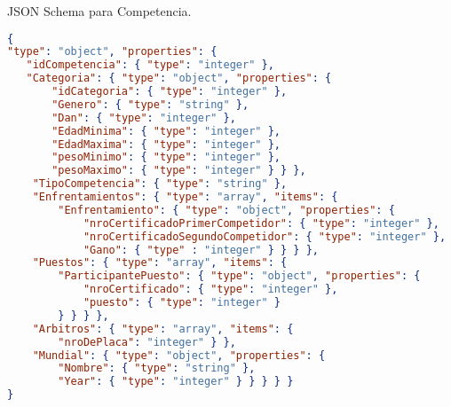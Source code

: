 JSON Schema para Competencia.
\begin{lstlisting}[language=json]
{
"type": "object", "properties": {
   "idCompetencia": { "type": "integer" },
   "Categoria": { "type": "object", "properties": {
       "idCategoria": { "type": "integer" },
       "Genero": { "type": "string" },
       "Dan": { "type": "integer" },
       "EdadMinima": { "type": "integer" },
       "EdadMaxima": { "type": "integer" },
       "pesoMinimo": { "type": "integer" },
       "pesoMaximo": { "type": "integer" } } },
    "TipoCompetencia": { "type": "string" },
    "Enfrentamientos": { "type": "array", "items": {
        "Enfrentamiento": { "type": "object", "properties": {
            "nroCertificadoPrimerCompetidor": { "type": "integer" },
            "nroCertificadoSegundoCompetidor": { "type": "integer" },
            "Gano": { "type" : "integer" } } } },
    "Puestos": { "type": "array", "items": {
        "ParticipantePuesto": { "type": "object", "properties": {
            "nroCertificado": { "type": "integer" },
            "puesto": { "type": "integer" }
        } } } },
    "Arbitros": { "type": "array", "items": {
        "nroDePlaca": "integer" } },
    "Mundial": { "type": "object", "properties": {
        "Nombre": { "type": "string" },
        "Year": { "type": "integer" } } } } }
}
\end{lstlisting}
